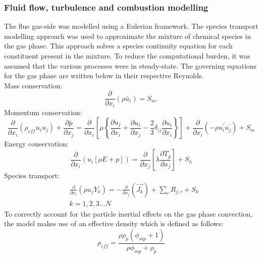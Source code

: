 \documentclass[review]{elsarticle}
\begin{document}
\subsubsection{Fluid flow, turbulence and combustion modelling}
The flue gas-side was modelled using a Eulerian framework. The species transport modelling approach was used to approximate the mixture of chemical species in the gas phase. This approach solves a species continuity equation for each constituent present in the mixture. To reduce the computational burden, it was assumed that the various processes were in steady-state. The governing equations for the gas phase are written below in their respective Reynolds.\\
Mass conservation:
\begin{equation}\label{eqn_RANS_mass}
\frac{\partial}{\partial x_{i}}(\rho \bar{u}_{i})=S_{m}.
\end{equation}
Momentum conservation:
\begin{equation}\label{eqn_momentum}
\frac{\partial}{\partial x_{i}}(\rho_{eff} u_{i}u_{j})+\frac{\partial \overline{p}}{\partial x_{j}}=\frac{\partial}{\partial x_{i}}\left[\mu\left\{\frac{\partial u_{j}}{\partial x_{i}}+\frac{\partial u_{i}}{\partial x_{j}}-\frac{2}{3}\delta_{ij}\frac{\partial u_{i}}{\partial x_{i}}\right\}\right]+\frac{\partial}{\partial x_{i}}(-\rho\overline{u_{i}^{'}u_{j}^{'}})+S_m
\end{equation}
Energy conservation:
\begin{equation}\label{eqn_energy}
\frac{\partial }{\partial x_{i}} (u_{i}[\rho E+p])=\frac{\partial }{\partial x_{j}}\left[\lambda\frac{\partial T_{g}}{\partial x_{j}}\right] +S_{h}
\end{equation}
Species transport:
\begin{equation}\label{eqn_species}
\begin{split}
&\frac{\partial}{\partial x_{i}}(\rho u_{j}Y_{k})=-\frac{\partial}{\partial x_{j}}(\vec{J_{k}})+ \sum_r R_{j,r} + S_{k}\\
&k = 1,2,3...N
\end{split}
\end{equation}
To correctly account for the particle inertial effects on the gas phase convection, the model makes use of an effective density which is defined as follows:
\begin{equation} \label{eqn_eff_rho}
	\rho_{eff} = \frac{\rho \rho_p \left( \phi_{mp} + 1 \right)}{\rho \phi_{mp} + \rho_p}
\end{equation}
\end{document}
